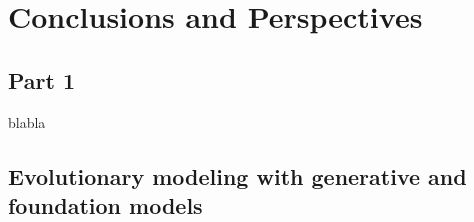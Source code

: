 \chapter{Conclusions and Perspectives}


\section{Part 1}
blabla

\section{Evolutionary modeling with generative and foundation models}